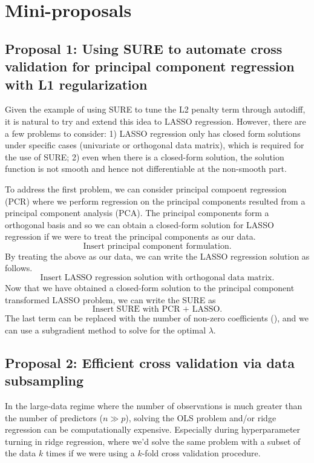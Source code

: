 

\section{Mini-proposals}

\subsection{Proposal 1: Using SURE to automate cross validation for principal component regression with L1 regularization} %
Given the example of using SURE to tune the L2 penalty term through autodiff, it is natural to try and extend this idea to LASSO regression. However, there are a few problems to consider: 1) LASSO regression only has closed form solutions under specific cases (univariate or orthogonal data matrix), which is required for the use of SURE; 2) even when there is a closed-form solution, the solution function is not smooth and hence not differentiable at the non-smooth part. 

To address the first problem, we can consider principal compoent regression (PCR) where we perform regression on the principal components resulted from a principal component analysis (PCA). The principal components form a orthogonal basis and so we can obtain a closed-form solution for LASSO regression if we were to treat the principal components as our data.
\[
\text{Insert principal component formulation.}
\]
By treating the above as our data, we can write the LASSO regression solution as follows.
\[
\text{Insert LASSO regression solution with orthogonal data matrix.}
\]
Now that we have obtained a closed-form solution to the principal component transformed LASSO problem, we can write the SURE as
\[
\text{Insert SURE with PCR + LASSO.}
\]
The last term can be replaced with the number of non-zero coefficients (\citet{tibshirani2015stein}), and we can use a subgradient method to solve for the optimal $\lambda$.
\pagebreak

\subsection{Proposal 2: Efficient cross validation via data subsampling} %
In the large-data regime where the number of observations is much greater than the number of predictors ($n\gg p$), solving the OLS problem and/or ridge regression can be computationally expensive. Especially during hyperparameter turning in ridge regression, where we'd solve the same problem with a subset of the data $k$ times if we were using a $k$-fold cross validation procedure. 

